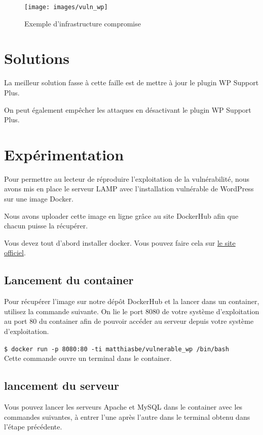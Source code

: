 \documentclass[a4,12pt]{article}
\begin{document}
\begin{figure}[h]
  \center
  \texttt{[image: images/vuln\_wp]}
  \caption{\label{archi}Exemple d'infrastructure compromise}
\end{figure}

\section{Solutions}

La meilleur solution fasse à cette faille est de mettre à jour le plugin WP Support Plus.

On peut également empêcher les attaques en désactivant le plugin WP Support Plus.

\section{Expérimentation}

Pour permettre au lecteur de réproduire l'exploitation de la vulnérabilité, nous avons mis en place le serveur LAMP avec l'installation vulnérable de WordPress sur une image Docker.

Nous avons uploader cette image en ligne gr\^ace au site DockerHub afin que chacun puisse la récupérer.

Vous devez tout d'abord installer docker. Vous pouvez faire cela sur \href{https://docker.io}{le site officiel}.\\

\subsection{Lancement du container}

Pour récupérer l'image sur notre dép\^ot DockerHub et la lancer dans un container, utilisez la commande suivante. On lie le port 8080 de votre système d'exploitation au port 80 du container afin de pouvoir accéder au serveur depuis votre système d'exploitation.

\texttt{\$ docker run -p 8080:80 -ti matthiasbe/vulnerable\_wp /bin/bash}\\

Cette commande ouvre un terminal dans le container.

\subsection{lancement du serveur}

Vous pouvez lancer les serveurs Apache et MySQL dans le container avec les commandes suivantes, à entrer l'une après l'autre dans le terminal obtenu dans l'étape précédente.
\end{document}
